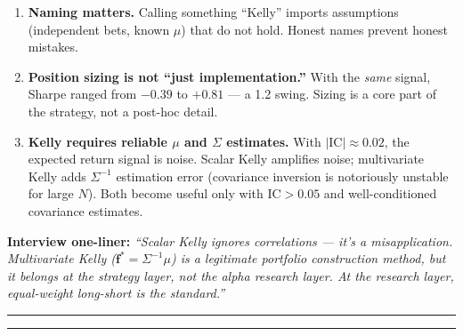 \documentclass[a4paper, 11pt]{report}
\theoremstyle{definition}
\theoremstyle{remark}
\begin{document}
\begin{description}[style=nextline, leftmargin=1.8cm]
    \item[Why It Matters]
        \begin{enumerate}[nosep]
            \item \textbf{Naming matters.}  Calling something ``Kelly''
                  imports assumptions (independent bets, known $\mu$)
                  that do not hold.  Honest names prevent honest mistakes.
            \item \textbf{Position sizing is not ``just implementation.''}
                  With the \emph{same} signal, Sharpe ranged from
                  $-0.39$ to $+0.81$ --- a 1.2 swing.  Sizing is
                  a core part of the strategy, not a post-hoc detail.
            \item \textbf{Kelly requires reliable $\mu$ and $\Sigma$
                  estimates.}
                  With $|\mathrm{IC}| \approx 0.02$, the expected
                  return signal is noise.  Scalar Kelly amplifies
                  noise; multivariate Kelly adds $\Sigma^{-1}$
                  estimation error (covariance inversion is
                  notoriously unstable for large $N$).  Both become
                  useful only with $\mathrm{IC} > 0.05$ and
                  well-conditioned covariance estimates.
        \end{enumerate}

        \medskip
        \textbf{Interview one-liner:}
        \emph{``Scalar Kelly ignores correlations --- it's a
        misapplication.  Multivariate Kelly
        ($\mathbf{f}^*=\Sigma^{-1}\mu$) is a legitimate portfolio
        construction method, but it belongs at the strategy layer,
        not the alpha research layer.  At the research layer,
        equal-weight long-short is the standard.''}
\end{description}

\bigskip\noindent\rule{\textwidth}{0.4pt}


\bigskip\noindent\rule{\textwidth}{0.4pt}
\end{document}
